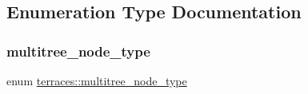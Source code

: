 \subsection{Enumeration Type Documentation}
\mbox{\label{namespaceterraces_ae1e4987c27eddd3b87041a2f0479bcc1}} 
\subsubsection{\texorpdfstring{multitree\+\_\+node\+\_\+type}{multitree\_node\_type}}
{\footnotesize\ttfamily enum \hyperlink{namespaceterraces_ae1e4987c27eddd3b87041a2f0479bcc1}{terraces\+::multitree\+\_\+node\+\_\+type}\hspace{0.3cm}{\ttfamily [strong]}}

